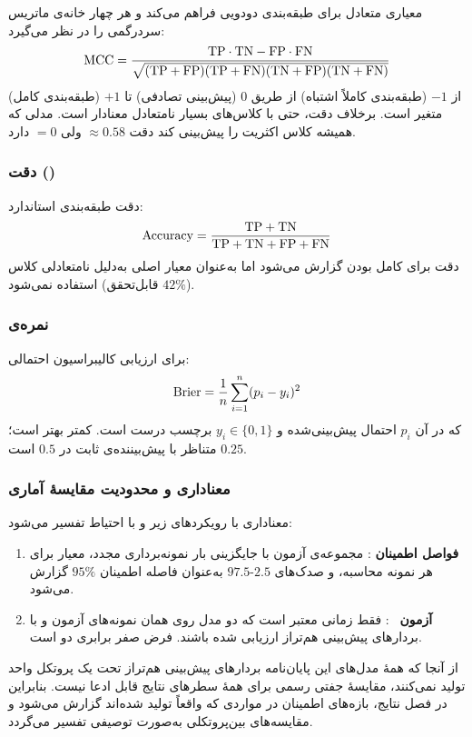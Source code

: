  معیاری متعادل برای طبقه‌بندی دودویی فراهم می‌کند و هر چهار خانه‌ی ماتریس سردرگمی را در نظر می‌گیرد:
\begin{equation}
\text{MCC} = \frac{\text{TP} \cdot \text{TN} - \text{FP} \cdot \text{FN}}{\sqrt{(\text{TP}+\text{FP})(\text{TP}+\text{FN})(\text{TN}+\text{FP})(\text{TN}+\text{FN})}}
\end{equation}
 از $-1$ (طبقه‌بندی کاملاً اشتباه) از طریق $0$ (پیش‌بینی تصادفی) تا $+1$ (طبقه‌بندی کامل) متغیر است. برخلاف دقت،  حتی با کلاس‌های بسیار نامتعادل معنادار است. مدلی که همیشه کلاس اکثریت را پیش‌بینی کند دقت $\approx 0.58$ ولی  $= 0$ دارد.

\subsubsection{دقت ()}

دقت طبقه‌بندی استاندارد:
\begin{equation}
\text{Accuracy} = \frac{\text{TP} + \text{TN}}{\text{TP} + \text{TN} + \text{FP} + \text{FN}}
\end{equation}
دقت برای کامل بودن گزارش می‌شود اما به‌عنوان معیار اصلی به‌دلیل نامتعادلی کلاس ($42\%$ قابل‌تحقق) استفاده نمی‌شود.

\subsubsection{نمره‌ی }

برای ارزیابی کالیبراسیون احتمالی:
\begin{equation}
\text{Brier} = \frac{1}{n} \sum_{i=1}^{n} (p_i - y_i)^2
\end{equation}
که در آن $p_i$ احتمال پیش‌بینی‌شده و $y_i \in \{0,1\}$ برچسب درست است. کمتر بهتر است؛ $0.25$ متناظر با پیش‌بیننده‌ی ثابت در $0.5$ است.

\subsubsection{معناداری و محدودیت مقایسۀ آماری}

معناداری با رویکردهای زیر و با احتیاط تفسیر می‌شود:
\begin{enumerate}
\item \textbf{فواصل اطمینان }: مجموعه‌ی آزمون با جایگزینی  بار نمونه‌برداری مجدد، معیار برای هر نمونه محاسبه، و صدک‌های $2.5$-$97.5$ به‌عنوان فاصله اطمینان $95\%$ گزارش می‌شود.
\item \textbf{آزمون }~\cite{delong1988comparing}: فقط زمانی معتبر است که دو مدل روی همان نمونه‌های آزمون و با بردارهای پیش‌بینی هم‌تراز ارزیابی شده باشند. فرض صفر برابری دو  است.
\end{enumerate}
از آنجا که همۀ مدل‌های این پایان‌نامه بردارهای پیش‌بینی هم‌تراز تحت یک پروتکل واحد تولید نمی‌کنند، مقایسۀ جفتی رسمی برای همۀ سطرهای نتایج قابل ادعا نیست. بنابراین در فصل نتایج، بازه‌های اطمینان در مواردی که واقعاً تولید شده‌اند گزارش می‌شود و مقایسه‌های بین‌پروتکلی به‌صورت توصیفی تفسیر می‌گردد.

